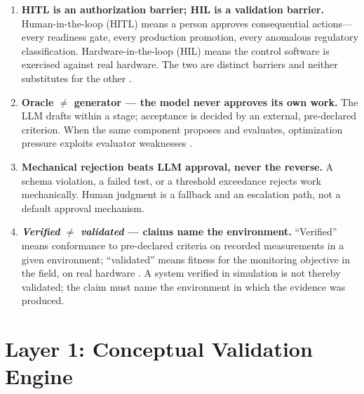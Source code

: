 \documentclass[11pt,a4paper]{article}
\begin{document}
\begin{enumerate}[label=\textbf{P\arabic*.}]
  \item \textbf{HITL is an authorization barrier; HIL is a validation barrier.}
    Human-in-the-loop (HITL) means a person approves consequential actions---every readiness
    gate, every production promotion, every anomalous regulatory classification.
    Hardware-in-the-loop (HIL) means the control software is exercised against real hardware.
    The two are distinct barriers and neither substitutes for the other \cite{opalrt2026}.
  \item \textbf{Oracle $\neq$ generator --- the model never approves its own work.}
    The LLM drafts within a stage; acceptance is decided by an external, pre-declared criterion.
    When the same component proposes and evaluates, optimization pressure exploits evaluator
    weaknesses \cite{judge2026}.
  \item \textbf{Mechanical rejection beats LLM approval, never the reverse.}
    A schema violation, a failed test, or a threshold exceedance rejects work mechanically.
    Human judgment is a fallback and an escalation path, not a default approval mechanism.
  \item \textbf{\emph{Verified} $\neq$ \emph{validated} --- claims name the environment.}
    ``Verified'' means conformance to pre-declared criteria on recorded measurements in a given
    environment; ``validated'' means fitness for the monitoring objective in the field, on real
    hardware \cite{sheridan2026b}. A system verified in simulation is not thereby validated;
    the claim must name the environment in which the evidence was produced.
\end{enumerate}

\section{Layer 1: Conceptual Validation Engine}
\label{sec:layer1}
\end{document}
